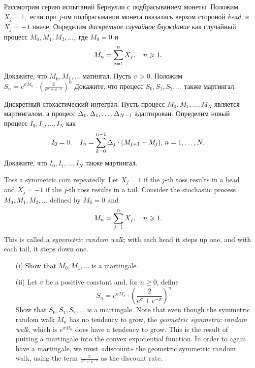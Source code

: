 \begin{problem}
 Рассмотрим серию испытаний Бернулли с подбрасыванием монеты. Положим $X_j=1,$
  если при $j$-ом подбрасывании монета оказалась верхом стороной \emph{head}, и
  $X_j=-1$ иначе. Определим \emph{дискретное случайное блуждание} как
  случайный процесс $M_0,M_1,M_2,\dots,$ где $M_0=0$ и
\[
  M_n=\sum\limits_{j=1}^{n} X_j,\quad n\geqslant 1.
\]
  \ni Докажите, что $M_0,M_1,\dots$ матингал. Пусть $\sigma>0.$
  Положим $S_n=e^{\sigma M_n}\cdot\left(\frac{2}{e^{\sigma}+e^{-\sigma}} \right)^n$
  \ni Докажите, что процесс $S_0,S_1,S_2,\dots$ также мартингал.

\begin{sol}

\end{sol}
\end{problem}

\begin{problem}
 Дискретный стохастический интеграл. Пусть процесс $M_0,M_1,\dots,M_N$ является
  мартингалом, а процесс $\Delta_0,\Delta_1,\dots,\Delta_{N-1}$ адаптирован. Определим новый процесс
  $I_0,I_1,\dots,I_N$ как
 \[
  I_0=0,\quad I_n=\sum\limits_{k=0}^{n-1} \Delta_j\cdot (M_{j+1}-M_j),\, n=1,\dots,N.
\]
  \ni Докажите, что $I_0,I_1,\dots,I_N$ также мартингал.

\begin{sol}

\end{sol}
\end{problem}

\begin{problem}
 Toss a symmetric coin repeatedly. Let $X_j=1$ if the $j$-th toss
results in a head and $X_j=-1$ if the $j$-th toss results in a tail. Consider the
stochastic process $M_0,M_1,M_2,\dots$ defined by $M_0=0$ and
\[
M_n=\sum\limits_{j=1}^{n} X_j,\quad n\geqslant 1.
\]
\ni This is called a \emph{symmetric random walk}; with each head it steps up one,
and with each tail, it steps down one.

\begin{enumerate}
\item[(i)] Show that $M_0,M_1,\dots$ is a martingale

\item[(ii)] Let $\sigma$ be a positive constant and, for $n\ge 0$, define
\[
S_n=e^{\sigma M_n}\cdot\left(\frac{2}{e^{\sigma}+e^{-\sigma}} \right)^n
\]
\ni Show that $S_0,S_1,S_2,\dots$ is a martingale. Note that even though the symmetric random
walk $M_n$ has no tendency to grow, the \emph{geometric symmetric random walk}, which is
$e^{\sigma M_n}$ does have a tendency to grow. This is the result of putting a martingale into
the convex exponential function. In order to again have a martingale, we must «discount» the
geometric symmetric random walk, using the term  $\frac{2}{e^{\sigma}+e^{-\sigma}}$ as the discount rate.
\end{enumerate}

\begin{sol}

\end{sol}
\end{problem}

